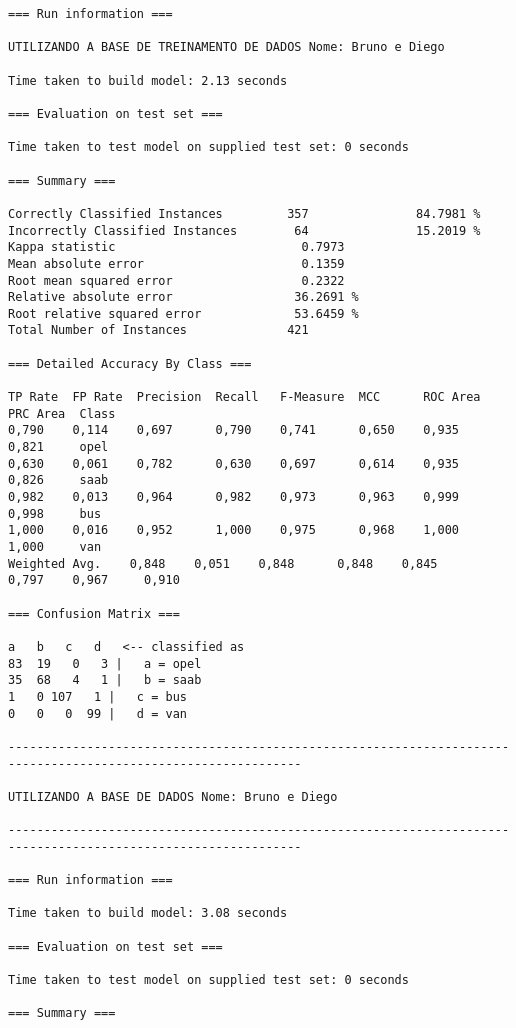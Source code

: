 \documentclass[
	article,			%
	11pt,				%
	oneside,			%
	a4paper,			%
	english,			%
	brazil,				%
	sumario=tradicional
	]{abntex2}
\begin{document}
\begin{lstlisting}
=== Run information ===

UTILIZANDO A BASE DE TREINAMENTO DE DADOS Nome: Bruno e Diego

Time taken to build model: 2.13 seconds

=== Evaluation on test set ===

Time taken to test model on supplied test set: 0 seconds

=== Summary ===

Correctly Classified Instances         357               84.7981 %
Incorrectly Classified Instances        64               15.2019 %
Kappa statistic                          0.7973
Mean absolute error                      0.1359
Root mean squared error                  0.2322
Relative absolute error                 36.2691 %
Root relative squared error             53.6459 %
Total Number of Instances              421     

=== Detailed Accuracy By Class ===

TP Rate  FP Rate  Precision  Recall   F-Measure  MCC      ROC Area  PRC Area  Class
0,790    0,114    0,697      0,790    0,741      0,650    0,935     0,821     opel
0,630    0,061    0,782      0,630    0,697      0,614    0,935     0,826     saab
0,982    0,013    0,964      0,982    0,973      0,963    0,999     0,998     bus
1,000    0,016    0,952      1,000    0,975      0,968    1,000     1,000     van
Weighted Avg.    0,848    0,051    0,848      0,848    0,845      0,797    0,967     0,910     

=== Confusion Matrix ===

a   b   c   d   <-- classified as
83  19   0   3 |   a = opel
35  68   4   1 |   b = saab
1   0 107   1 |   c = bus
0   0   0  99 |   d = van

---------------------------------------------------------------------------------------------------------------

UTILIZANDO A BASE DE DADOS Nome: Bruno e Diego

---------------------------------------------------------------------------------------------------------------

=== Run information ===

Time taken to build model: 3.08 seconds

=== Evaluation on test set ===

Time taken to test model on supplied test set: 0 seconds

=== Summary ===


\end{lstlisting}
\end{document}
